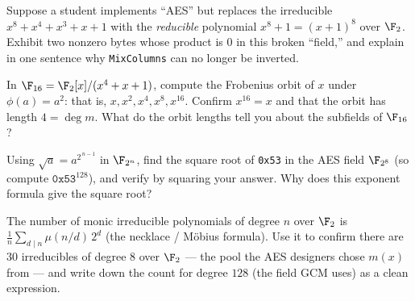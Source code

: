 \begin{exercise}
\label{ch06:ex-break}
Suppose a student implements ``AES'' but replaces the irreducible
$x^8+x^4+x^3+x+1$ with the \emph{reducible} polynomial $x^8+1 = (x+1)^8$ over
$\F_2$. Exhibit two nonzero bytes whose product is $0$ in this broken
``field,'' and explain in one sentence why \texttt{MixColumns} can no longer
be inverted.
\end{exercise}

\begin{exercise}
\label{ch06:ex-frob}
In $\F_{16} = \F_2[x]/(x^4+x+1)$, compute the Frobenius orbit of $x$ under
$\phi(a)=a^2$: that is, $x, x^2, x^4, x^8, x^{16}$. Confirm $x^{16}=x$ and
that the orbit has length $4 = \deg m$. What do the orbit lengths tell you
about the subfields of $\F_{16}$?
\end{exercise}

\begin{exercise}
\label{ch06:ex-sqrt}
Using $\sqrt{a} = a^{2^{\,n-1}}$ in $\F_{2^n}$, find the square root of
\texttt{0x53} in the AES field $\F_{2^8}$ (so compute $\texttt{0x53}^{128}$),
and verify by squaring your answer. Why does this exponent formula give the
square root?
\end{exercise}

\begin{exercise}
\label{ch06:ex-count}
The number of monic irreducible polynomials of degree $n$ over $\F_2$ is
$\frac{1}{n}\sum_{d \mid n}\mu(n/d)\,2^{d}$ (the necklace / M\"obius
formula). Use it to confirm there are $30$ irreducibles of degree $8$ over
$\F_2$ --- the pool the AES designers chose $m(x)$ from --- and write down
the count for degree $128$ (the field GCM uses) as a clean expression.
\end{exercise}
